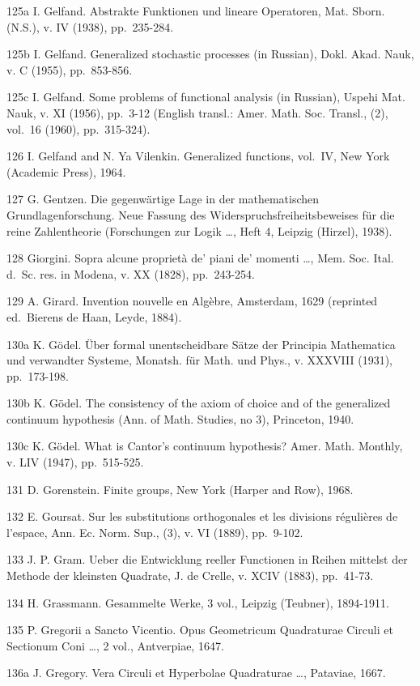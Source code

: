 125a I. Gelfand. Abstrakte Funktionen und lineare Operatoren, Mat. Sborn. (N.S.), v. IV (1938), pp.~235-284.

125b I. Gelfand. Generalized stochastic processes (in Russian), Dokl. Akad. Nauk, v. C (1955), pp.~853-856.

125c I. Gelfand. Some problems of functional analysis (in Russian), Uspehi Mat. Nauk, v. XI (1956), pp.~3-12 (English transl.: Amer. Math. Soc. Transl., (2), vol.~16 (1960), pp.~315-324).

126 I. Gelfand and N. Ya Vilenkin. Generalized functions, vol.~IV, New York (Academic Press), 1964.

127 G. Gentzen. Die gegenwärtige Lage in der mathematischen Grundlagenforschung. Neue Fassung des Widerspruchsfreiheitsbeweises für die reine Zahlentheorie (Forschungen zur Logik \ldots, Heft 4, Leipzig (Hirzel), 1938).

128 Giorgini. Sopra alcune proprietà de' piani de' momenti \ldots, Mem. Soc. Ital. d.~Sc. res. in Modena, v. XX (1828), pp.~243-254.

129 A. Girard. Invention nouvelle en Algèbre, Amsterdam, 1629 (reprinted ed.~Bierens de Haan, Leyde, 1884).

130a K. Gödel. Über formal unentscheidbare Sätze der Principia Mathematica und verwandter Systeme, Monatsh. für Math. und Phys., v. XXXVIII (1931), pp.~173-198.

130b K. Gödel. The consistency of the axiom of choice and of the generalized continuum hypothesis (Ann. of Math. Studies, no 3), Princeton, 1940.

130c K. Gödel. What is Cantor's continuum hypothesis? Amer. Math. Monthly, v. LIV (1947), pp.~515-525.

131 D. Gorenstein. Finite groups, New York (Harper and Row), 1968.

132 E. Goursat. Sur les substitutions orthogonales et les divisions régulières de l'espace, Ann. Ec. Norm. Sup., (3), v. VI (1889), pp.~9-102.

133 J. P. Gram. Ueber die Entwicklung reeller Functionen in Reihen mittelst der Methode der kleinsten Quadrate, J. de Crelle, v. XCIV (1883), pp.~41-73.

134 H. Grassmann. Gesammelte Werke, 3 vol., Leipzig (Teubner), 1894-1911.

135 P. Gregorii a Sancto Vicentio. Opus Geometricum Quadraturae Circuli et Sectionum Coni \ldots, 2 vol., Antverpiae, 1647.

136a J. Gregory. Vera Circuli et Hyperbolae Quadraturae \ldots, Pataviae, 1667.

